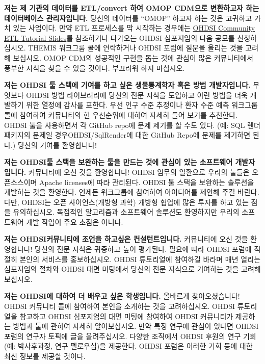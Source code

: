 \documentclass[11pt]{book}
\theoremstyle{definition}
\theoremstyle{definition}
\theoremstyle{definition}
\theoremstyle{remark}
\begin{document}
\textbf{저는 제 기관의 데이터를 ETL/convert 하여 OMOP CDM으로 변환하고자
하는 데이터베이스 관리자입니다.} 당신의 데이터를 ``OMOP'' 하고자 하는
것은 고귀하고 가치 있는 사업이다. 만약 ETL 프로세스를 막 시작하는
경우에는
\href{https://www.ohdsi-europe.org/images/symposium-2019/tutorials/OHDSI_Vocabulary_CDM_Tutorial.pdf}{OHDSI
Community ETL Tutorial Slides}를 참조하거나 다가오는 OHDSI 심포지엄의
다음 공모를 신청하십시오. THEMIS 워크그룹 콜에 연락하거나 OHDSI 포럼에
질문을 올리는 것을 고려해 보십시오. OMOP CDM의 성공적인 구현을 돕는 것에
관심이 많은 커뮤니티에서 풍부한 지식을 찾을 수 있을 것이다. 부끄러워
하지 마십시오.

\textbf{저는 OHDSI 툴 스택에 기여를 하고 싶은 생물통계학자 혹은 방법
개발자입니다.} 무엇보다 OHDSI 방법 라이브러리에 당신의 전문 지식을
도입하고 이런 방법을 더욱 개발하기 위한 열정에 감사를 표한다. 우선 인구
수준 추정이나 환자 수준 예측 워크그룹 콜에 참여하여 커뮤니티의 현
우선순위에 대하여 자세히 들어 보기를 추천한다. OHDSI 툴을 사용하면서 각
GitHub repo에 문제 제기를 할 수도 있다. (예: SQL 렌더 패키지의 문제일
경우OHDSI/SqlRender에 대한 GitHub Repo에 문제를 제기하면 된다.) 당신의
기여를 환영합니다!

\textbf{저는 OHDSI툴 스택을 보완하는 툴을 만드는 것에 관심이 있는
소프트웨어 개발자입니다.} 커뮤니티에 오신 것을 환영합니다! OHDSI 임무의
일환으로 우리의 툴들은 오픈소스이며 Apache licenses에 따라 관리된다.
OHDSI 툴 스택을 보완하는 솔루션을 개발하는 것을 환영한다. 언제든
워크그룹에 참여하여 아이디어를 제안해 주길 바란다. 다만, OHDSI는 오픈
사이언스(개방형 과학) 개방형 협업에 많은 투자를 하고 있는 점을
유의하십시오. 독점적인 알고리즘과 소프트웨어 솔루션도 환영하지만 우리의
소프트웨어 개발 작업이 주요 초점은 아니다.

\textbf{저는 OHDSI커뮤니티에 조언을 하고싶은 컨설턴트입니다.} 커뮤니티에
오신 것을 환영합니다! 당신의 전문 지식은 귀중하고 높이 평가된다. 필요에
따라 OHDSI 포럼에 적절히 본인의 서비스를 홍보하십시오. OHDSI 튜토리얼에
참여하길 바라며 매년 열리는 심포지엄의 절차와 OHDSI 대면 미팅에서 당신의
전문 지식으로 기여하는 것을 고려해 보십시오.

\textbf{저는 OHDSI에 대하여 더 배우고 싶은 학생입니다.} 올바르게
찾아오셨습니다! OHDSI 커뮤니티 콜에 참여하여 본인을 소개하는 것을
고려하십시오. OHDSI 튜토리얼을 참고하고 OHDSI 심포지엄의 대면 미팅에
참여하여 OHDSI 커뮤니티가 제공하는 방법과 툴에 관하여 자세히
알아보십시오. 만약 특정 연구에 관심이 있다면 OHDSI 포럼의 연구자 토픽에
글을 올려주십시오. 다양한 조직에서 OHDSI 후원의 연구 기회(예:
박사후과정, 연구 펠로우십)을 제공한다. OHDSI 포럼은 이러한 기회 등에
대한 최신 정보를 제공할 것이다.
\end{document}
